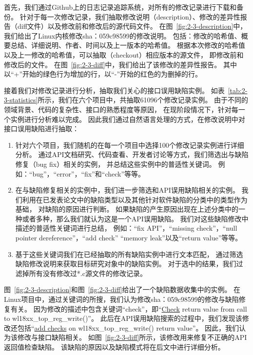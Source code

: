 首先，我们通过Github上的日志记录追踪系统，对所有的修改记录进行下载和备份。
针对于每一次修改记录，我们抽取修改说明（description）、修改的差异性报告（diff文件）以及修改前和修改后的源代码文件。
在图~\ref{fig:2-3-description}中，我们给出了Linux内核修改sha：059c98599的修改说明。
包括：修改的哈希值、概要总结、详细说明、作者、时间以及上一版本的哈希值。
根据本次修改的哈希值以及上一修改的哈希值，可以抽取（checkout）相应版本的源文件，
即修改前和修改后的文件。
在图~\ref{fig:2-3-diff}中，我们给出了该修改的差异性报告。
其中以“+”开始的绿色行为增加的行，以“-”开始的红色的为删掉的行。

接着我们对修改记录进行分析，抽取我们关心的接口误用缺陷实例。
如表~\ref{tab:2-3-statistics}所示，我们在六个项目中，共抽取61096个修改记录实例。
由于不同的领域背景、代码的复杂性、接口的熟悉程度等原因，
在现阶段情况下，针对每一个实例进行分析难以完成。
因此我们通过自然语言处理的方式，在修改说明中对接口误用缺陷进行抽取：
\begin{enumerate}
	\item 针对六个项目，我们随机的在每一个项目中选择100个修改记录实例进行详细分析。
	通过API文档研究、代码查看、开发者讨论等方式，我们筛选出与缺陷修复（bug fix）相关的实例，
	并总结这些实例中的普适性关键词。
	例如：“bug”，“error”，“fix”和“check”等等。
	\item 在与缺陷修复相关的实例中，我们进一步筛选和API误用缺陷相关的实例。
	我们利用在已发表论文中的缺陷类型以及其他针对软件缺陷的分类中的类型作为基础，
	对缺陷的原因进行判断。
	如果缺陷的产生原因出现在上述分类中的一种或者多种，那么我们就认为这是一个API误用缺陷。
	我们对这些缺陷修改中描述的普适性关键词进行总结，
	例如：“fix API”，“missing check”，“null pointer dereference”，“add check” “memory leak”以及“return value”等等。
	\item 基于这些关键词我们在已经抽取的所有缺陷实例中进行文本匹配，
	通过筛选缺陷修改说明来获取目标研究对象中的缺陷实例。
	对于选中的结果，我们过滤掉所有没有修改过*.c源文件的修改记录。
\end{enumerate}

图~\ref{fig:2-3-description}和图~\ref{fig:2-3-diff}给出了一个缺陷数据收集中的实例。
在Linux项目中，通过关键词的所搜，我们认为修改sha：059c98599的修改与缺陷修复有关。
因为修改的描述中包含关键词“check”，即“\underline{Check} return value from call to wl18xx\_top\_reg\_write()”。
此后在API误用缺陷搜索的过程中，我们发现该修改还包括“\underline{add checks} on wl18xx\_top\_reg\_write() return value”。
因此，我们认为该修改与接口缺陷相关。
如图~\ref{fig:2-3-diff}所示，该修改用来修复不正确的API返回值检查缺陷。
该缺陷的原因以及缺陷模式将在后文中进行详细分析。

